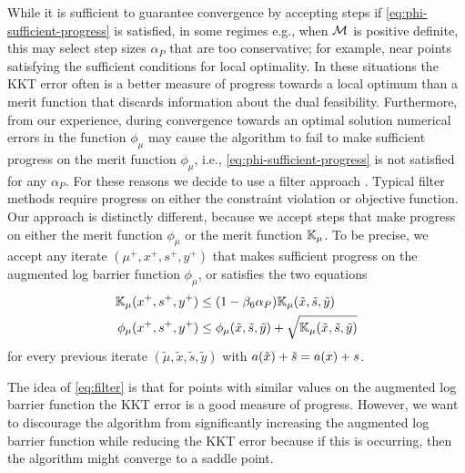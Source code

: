\documentclass{article}
\begin{document}
While it is sufficient to guarantee convergence by accepting steps if \eqref{eq:phi-sufficient-progress} is satisfied, in some regimes e.g., when $\mathcal{M}$ is positive definite, this may select step sizes $\alpha_{P}$ that are too conservative;  for example, near points satisfying the sufficient conditions for local optimality. In these situations the KKT error often is a better measure of progress towards a local optimum than a merit function that discards information about the dual feasibility. Furthermore, from our experience, during convergence towards an optimal solution numerical errors in the function $\phi_{\mu}$ may cause the algorithm to fail to make sufficient progress on the merit function $\phi_{\mu}$, i.e., \eqref{eq:phi-sufficient-progress} is not satisfied for any $\alpha_{P}$. For these reasons we decide to use a filter approach \cite{fletcher2002nonlinear,wachter2006implementation}. Typical filter methods \cite{fletcher2002nonlinear} require progress on either the constraint violation or objective function. Our approach is distinctly different, because we accept steps that make progress on either the merit function $\phi_{\mu}$ or the merit function $\mathbb{K}_{\mu}$.
To be precise, we accept any iterate $(\mu^{+}, x^{+}, s^{+}, y^{+})$ that makes sufficient progress on the augmented log barrier function $\phi_{\mu}$, or satisfies the two equations
\begin{subequations}\label{eq:filter}
\begin{flalign}
\meritKKT_{\mu} (x^{+}, s^{+}, y^{+}) &\le (1 - \parKKTReductFactor \alpha_{P} ) \meritKKT_{\mu} (\tilde{x}, \tilde{s}, \tilde{y}) \label{eq:kkt-progress} \\
\phi_{\mu}(x^{+}, s^{+}, y^{+}) &\le \phi_{\mu}(\tilde{x}, \tilde{s}, \tilde{y}) + \sqrt{\meritKKT_{\mu} (\tilde{x}, \tilde{s}, \tilde{y})} %
\end{flalign} %
\end{subequations}
 for every previous iterate $(\tilde{\mu}, \tilde{x}, \tilde{s}, \tilde{y})$ with $a(\tilde{x}) + \tilde{s} = a(x) + s$.

The idea of \eqref{eq:filter} is that for points with similar values on the augmented log barrier function the KKT error is a good measure of progress. However, we want to discourage the algorithm from significantly increasing the augmented log barrier function while reducing the KKT error because if this is occurring, then the algorithm might converge to a saddle point. 
\end{document}
